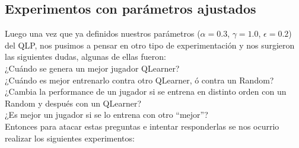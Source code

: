 \documentclass[10pt, a4paper]{article}
\begin{document}
\subsection{Experimentos con parámetros ajustados}

Luego una vez que ya definidos nuestros parámetros ($\alpha=0.3$, $\gamma=1.0$, $\epsilon=0.2$) del QLP, nos pusimos a pensar en otro tipo de experimentación y nos surgieron las siguientes dudas, algunas de ellas fueron:\\
¿Cuándo se genera un mejor jugador QLearner? \\
¿Cuándo es mejor entrenarlo contra otro QLearner, ó contra un Random? \\
¿Cambia la performance de un jugador si se entrena en distinto orden con un Random y después con un QLearner?\\
¿Es mejor un jugador si se lo entrena con otro ``mejor''?\\

Entonces para atacar estas preguntas e intentar responderlas se nos ocurrio realizar los siguientes experimentos:
\end{document}
